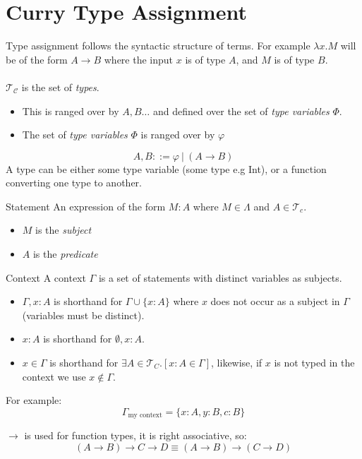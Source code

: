 \chapter{Curry Type Assignment}
Type assignment follows the syntactic structure of terms. For example $\lambda x . M$ will be of the form $A \to B$ where the input $x$ is of type $A$, and $M$ is of type $B$.
\\
\\ $\mathcal{T_C}$ is the set of \textit{types}. 
\begin{itemize}
    \item This is ranged over by $A, B \dots$ and defined over the set of \textit{type variables} $\Phi$.
    \item The set of \textit{type variables} $\Phi$ is ranged over by $\varphi$
\end{itemize}
\[A, B ::= \varphi \ | \ (A \to B) \]
A type can be either some type variable (some type e.g Int), or a function converting one type to another.
\begin{definitionbox}{Statement}
    An expression of the form $M : A$ where $M \in \Lambda$ and $A \in \mathcal{T}_c$.
    \begin{itemize}
        \item $M$ is the \textit{subject}
        \item $A$ is the \textit{predicate}
    \end{itemize}
\end{definitionbox}
\begin{definitionbox}{Context}
    A context $\Gamma$ is a set of statements with distinct variables as subjects.
    \begin{itemize}
        \item $\Gamma , x:A$ is shorthand for $\Gamma \cup \{x: A\}$ where $x$ does not occur as a subject in $\Gamma$ (variables must be distinct).
        \item $x:A$ is shorthand for $\emptyset, x:A$.
        \item $x \in \Gamma$ is shorthand for $\exists A \in \mathcal{T}_C . [x:A \in \Gamma]$, likewise, if $x$ is not typed in the context we use $x \not\in \Gamma$.
    \end{itemize}
    For example:
    \[\Gamma_{\text{my context}} = \{x : A, y : B, c: B\}\]
\end{definitionbox}

$\to$ is used for function types, it is right associative, so:
\[(A \to B) \to C \to D \equiv (A \to B) \to (C \to D)\]

